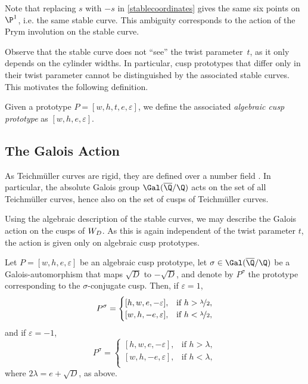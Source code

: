 \documentclass{amsart}
\makeatletter
\newcommand*{\@gobblenexttocentry}[9]{}
\newcommand*{\@gobblenexttocentry}[4]{}
\newcommand*{\addsubsection}{%
    \addtocontents{toc}{\protect\@gobblenexttocentry}%
    \subsection*}
\def\ep{\varepsilon}
\def\q#1{\textcolor{red}{[?? #1 ??]}}
\makeatother
\begin{document}
\begin{rem}\label{ssign}
Note that replacing $s$ with $-s$ in \autoref{stablecoordinates} gives the same six points on $\P^1$, i.e. the same stable curve. This ambiguity corresponds to the action of the Prym involution on the stable curve.
\end{rem}

\begin{rem}
Observe that the stable curve does not ``see'' the twist parameter~$t$, as it only depends on the cylinder widths. In particular, cusp prototypes that differ only in their twist parameter cannot be distinguished by the associated stable curves. This motivates the following definition.
\end{rem}

\begin{dfn}
Given a prototype $P=[w,h,t,e,\ep]$, we define the associated \emph{algebraic cusp prototype} as $[w,h,e,\ep]$.
\end{dfn}



\addsubsection{The Galois Action} As Teichmüller curves are rigid, they are defined over a number field \cites{mcmullenrigid}{moellerviehweg}. In particular, %
the absolute Galois group $\Gal(\overline{\Q}/\Q)$ acts on the set of all Teichmüller curves, hence also on the set of cusps of Teichmüller curves. %

Using the algebraic description of the stable curves, we may describe the Galois action on the cusps of $\W$. As this is again independent of the twist parameter $t$, the action is given only on algebraic cusp prototypes. 

\begin{prop}\label{galoiscusps}
Let $P=[w,h,e,\ep]$ be an algebraic cusp prototype, let $\sigma\in\Gal(\overline{\Q}/\Q)$ %
be a Galois-automorphism that maps $\sqrt{D}$ to $-\sqrt{D}$,
and denote by $P^\sigma$ the prototype corresponding to the $\sigma$-conjugate cusp. Then, if $\ep=1$,
\[P^\sigma=%
\begin{cases}
[h,w,e,-\ep],&\text{if $h>\nicefrac{\lambda}{2}$},\\
[w,h,-e,\ep],&\text{if $h<\nicefrac{\lambda}{2}$},\\
\end{cases}\]
and if $\ep=-1$,
\[P^\sigma=%
\begin{cases}
[h,w,e,-\ep],&\text{if $h>\lambda$},\\
[w,h,-e,\ep],&\text{if $h<\lambda$},\\
\end{cases}\]
where $2\lambda=e+\sqrt{D}$, as above.
\end{prop}
\end{document}
